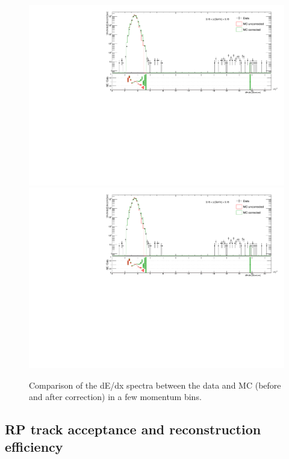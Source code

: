 \begin{figure}[hb]
{  \includegraphics[width=\linewidth,page=29]{graphics/corrections/dEdx_DataVsMC.pdf}\\
  \includegraphics[width=\linewidth,page=39]{graphics/corrections/dEdx_DataVsMC.pdf}
}%
\caption[Comparison of dE/dx spectra between data and MC.]{Comparison of the dE/dx spectra between the data and MC (before and after correction) in a few momentum bins.}\label{fig:dEdxDataVsMC}
\end{figure}














\subsection{RP track acceptance and reconstruction efficiency}\label{sec:rpAccAndEff}
